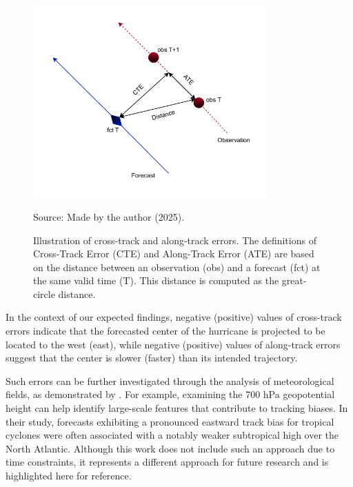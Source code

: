 \begin{figure}[htbp]
    \centering
    \caption{Illustration of cross-track and along-track errors. The definitions of Cross-Track Error (CTE) and Along-Track Error (ATE) are based on the distance between an observation (obs) and a forecast (fct) at the same valid time (T). This distance is computed as the great-circle distance.} %
    \includegraphics[width=0.8\textwidth]{docs/figuras/chapter4/cte_ate.pdf} 
    \label{fig:cross-along-errors}
    \vspace{0.5em}
    
    \centering
    Source: Made by the author (2025).
\end{figure}

In the context of our expected findings, negative (positive) values of cross-track errors indicate that the forecasted center of the hurricane is projected to be located to the west (east), while negative (positive) values of along-track errors suggest that the center is slower (faster) than its intended trajectory.


Such errors can be further investigated through the analysis of meteorological fields, as demonstrated by . For example, examining the 700 hPa geopotential height can help identify large-scale features that contribute to tracking biases. In their study, forecasts exhibiting a pronounced eastward track bias for tropical cyclones were often associated with a notably weaker subtropical high over the North Atlantic. Although this work does not include such an approach due to time constraints, it represents a different approach for future research and is highlighted here for reference.



